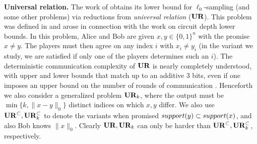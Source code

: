 \textbf{Universal relation.} The work of \cite{JowhariST11} obtains its lower bound for $\ell_0$-sampling (and some other problems) via reductions from {\em universal relation} ($\mathbf{UR}$). This problem was defined in \cite{KarchmerRW95} and arose in connection with the work \cite{KarchmerW90} on circuit depth lower bounds. 
In this problem, Alice and Bob are given $x,y\in\{0,1\}^n$ with the promise  $x\neq y$. The players must then agree on any index $i$ with $x_i\neq y_i$ (in the variant we study, we are satisfied if only one of the players determines such an $i$). The deterministic communication complexity of $\mathbf{UR}$ is nearly completely understood, with upper and lower bounds that match up to an additive $3$ bits, even if one imposes an upper bound on the number of rounds of communication \cite{TardosZ97}. Henceforth we also consider a generalized problem $\mathbf{UR}_k$, where the output must be $\min\{k, \|x-y\|_0\}$ distinct indices on which $x, y$ differ. We also use $\mathbf{UR}^{\subset}, \mathbf{UR}_k^{\subset}$ to denote the variants when promised $\mathop{support}(y)\subset \mathop{support}(x)$, and also Bob knows $\|x\|_0$. Clearly $\mathbf{UR}, \mathbf{UR}_k$ can only be harder than $\mathbf{UR}^\subset, \mathbf{UR}_k^\subset$, respectively.

